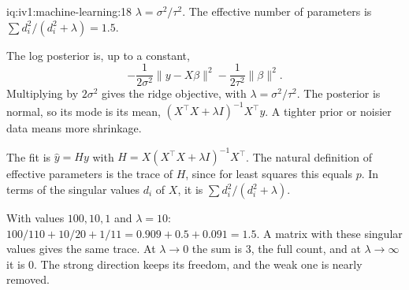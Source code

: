 \begin{solution}{iq:iv1:machine-learning:18}
$\lambda = \sigma^2/\tau^2$. The effective number of parameters is $\sum d_i^2/(d_i^2 + \lambda) = 1.5$.

The log posterior is, up to a constant,
\[
-\frac{1}{2\sigma^2}\|y - X\beta\|^2 - \frac{1}{2\tau^2}\|\beta\|^2.
\]
Multiplying by $2\sigma^2$ gives the ridge objective, with $\lambda = \sigma^2/\tau^2$. The posterior is normal, so its mode is its mean, $(X^\top X + \lambda I)^{-1}X^\top y$. A tighter prior or noisier data means more shrinkage.

The fit is $\hat{y} = Hy$ with $H = X(X^\top X + \lambda I)^{-1}X^\top$. The natural definition of effective parameters is the trace of $H$, since for least squares this equals $p$. In terms of the singular values $d_i$ of $X$, it is $\sum d_i^2/(d_i^2 + \lambda)$.

With values $100, 10, 1$ and $\lambda = 10$: $100/110 + 10/20 + 1/11 = 0.909 + 0.5 + 0.091 = 1.5$. A matrix with these singular values gives the same trace. At $\lambda \to 0$ the sum is 3, the full count, and at $\lambda \to \infty$ it is 0. The strong direction keeps its freedom, and the weak one is nearly removed.



\end{solution}

